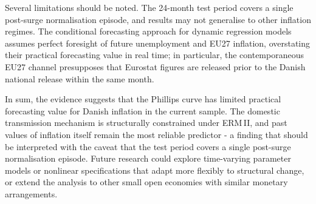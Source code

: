 Several limitations should be noted. The 24-month test period covers a single post-surge normalisation episode, and results may not generalise to other inflation regimes. The conditional forecasting approach for dynamic regression models assumes perfect foresight of future unemployment and EU27 inflation, overstating their practical forecasting value in real time; in particular, the contemporaneous EU27 channel presupposes that Eurostat figures are released prior to the Danish national release within the same month.

In sum, the evidence suggests that the Phillips curve has limited practical forecasting value for Danish inflation in the current sample. The domestic transmission mechanism is structurally constrained under ERM\,II, and past values of inflation itself remain the most reliable predictor - a finding that should be interpreted with the caveat that the test period covers a single post-surge normalisation episode. Future research could explore time-varying parameter models or nonlinear specifications that adapt more flexibly to structural change, or extend the analysis to other small open economies with similar monetary arrangements.